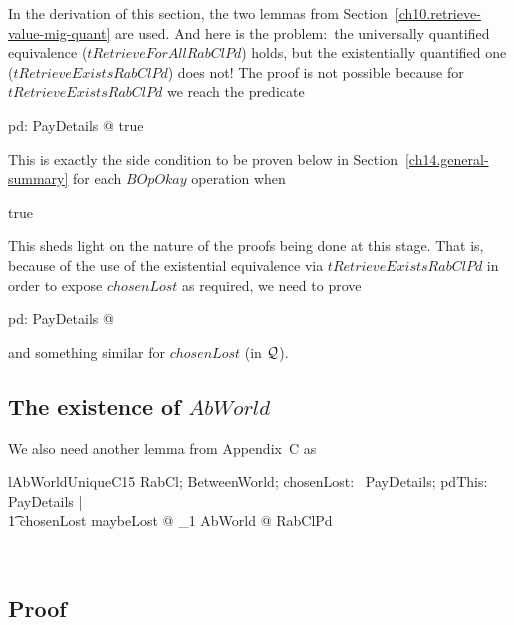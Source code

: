 In the derivation of this section, the two lemmas from Section~\ref{ch10.retrieve-value-mig-quant} are used.
And here is the problem:~the universally quantified equivalence ($tRetrieveForAllRabClPd$) holds,
but the existentially quantified one ($tRetrieveExistsRabClPd$) does not!
The proof is not possible because for $tRetrieveExistsRabClPd$ we reach the predicate
%
\begin{gzed}
    \exists pd: PayDetails @ true
\end{gzed}
%
This is exactly the side condition to be proven below in Section~\ref{ch14.general-summary}
for each $BOpOkay$ operation when
%
\begin{gzed}
   \pdThisPred \iff true
\end{gzed}
%
This sheds light on the nature of the proofs being done at this stage. That is,
because of the use of the existential equivalence via $tRetrieveExistsRabClPd$
in order to expose $chosenLost$ as required, we need to prove
%
\begin{gzed}
    \exists pd: PayDetails @ \pdThisPred
\end{gzed}
%
and something similar for $chosenLost$ (in $\mathcal{Q}$).

\subsection{The existence of $AbWorld$}

We also need another lemma from Appendix~C as
%
\begin{LLemma}
\begin{theorem}{lAbWorldUniqueC15}
    \forall RabCl; BetweenWorld; chosenLost: \power~PayDetails; pdThis: PayDetails | \\
        \t1 chosenLost \subseteq maybeLost @ \exists_1 AbWorld @ RabClPd
\end{theorem}~\end{LLemma}



\subsection*{Proof}

\begin{LPScript}\begin{zproof}[lAbWorldUniqueC15]

\end{zproof}~\end{LPScript}

